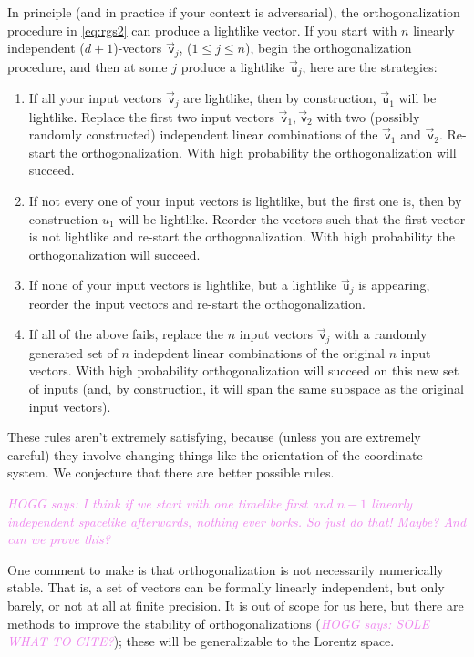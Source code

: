 \documentclass{article}
\newcommand\upvec[1]{\!\vec{\,\mathrm{#1}}}
\newcommand{\Lvec}[1]{\upvec{\mathsf{#1}}} %
\newcommand{\plus}{\!+\!} %
\newcommand{\HOGG}[1]{\textcolor{violet}{\textsl{HOGG says: {#1}}}}
\begin{document}
In principle (and in practice if your context is adversarial), the orthogonalization procedure in \eqref{eq:rgs2} can produce a lightlike vector.
If you start with $n$ linearly independent ($d\plus1$)-vectors $\Lvec{v}_j$, ($1\leq j\leq n$), begin the orthogonalization procedure, and then at some $j$ produce a lightlike $\Lvec{u}_j$, here are the strategies:
\begin{enumerate}
\item If all your input vectors $\Lvec{v}_j$ are lightlike, then by construction, $\Lvec{u}_1$ will be lightlike.
    Replace the first two input vectors $\Lvec{v}_1,\Lvec{v}_2$ with two (possibly randomly constructed) independent linear combinations of the $\Lvec{v}_1$ and $\Lvec{v}_2$.
    Re-start the orthogonalization.
    With high probability the orthogonalization will succeed.
    \item If not every one of your input vectors is lightlike, but the first one is, then by construction ${u}_1$ will be lightlike.
    Reorder the vectors such that the first vector is not lightlike and re-start the orthogonalization.
    With high probability the orthogonalization will succeed.
    \item If none of your input vectors is lightlike, but a lightlike $\Lvec{u}_j$ is appearing, reorder the input vectors and re-start the orthogonalization.
    \item If all of the above fails, replace the $n$ input vectors $\Lvec{v}_j$ with a randomly generated set of $n$ indepdent linear combinations of the original $n$ input vectors.
    With high probability orthogonalization will succeed on this new set of inputs (and, by construction, it will span the same subspace as the original input vectors).
\end{enumerate}
These rules aren't extremely satisfying, because (unless you are extremely careful) they involve changing things like the orientation of the coordinate system.
We conjecture that there are better possible rules.

\HOGG{I think if we start with one timelike first and $n-1$ linearly independent spacelike afterwards, nothing ever borks.
So just do that! Maybe? And can we prove this?}

One comment to make is that orthogonalization is not necessarily numerically stable.
That is, a set of vectors can be formally linearly independent, but only barely, or not at all at finite precision.
It is out of scope for us here, but there are methods to improve the stability of orthogonalizations (\HOGG{SOLE WHAT TO CITE?}); these will be generalizable to the Lorentz space.
\end{document}
